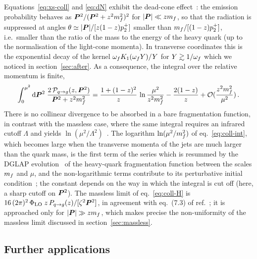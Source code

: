 Equations~\eqref{eq:xs-coll} and \eqref{eq:dN} exhibit the dead-cone
effect~\cite{Dokshitzer:1991fd}: the emission probability behaves as $\bm{P}^2/(\bm{P}^2+z^2m_f^2)^2$ for
$|\bm{P}|\ll zm_f$, so that the radiation is suppressed at angles
$\theta\simeq|\bm{P}|/[z(1-z)p_2^+]$ smaller than $m_f/[(1-z)p_2^+]$, i.e.\ smaller than the ratio of the
mass to the energy of the heavy quark (up to the normalisation of the light-cone momenta). In transverse coordinates this is the exponential decay of the
kernel $\omega_f K_1(\omega_f Y)/Y$ for $Y\gtrsim1/\omega_f$ which we noticed in section~\ref{sec:after}. As a
consequence, the integral over the relative momentum is finite,
\begin{equation}
\int_0^{\mu^2}{\rm d}\bm{P}^2\;\frac{2\,\mathcal{P}_{q\to g}(z,\bm{P}^2)}{\bm{P}^2+z^2m_f^2}
=\frac{1+(1-z)^2}{z}\,\ln\frac{\mu^2}{z^2m_f^2}-\frac{2(1-z)}{z}+\mathcal{O}(\frac{z^2m_f^2}{\mu^2})\,.
\label{eq:coll-int}
\end{equation}
There is no collinear divergence to be absorbed in a bare fragmentation function, in contrast with the
massless case, where the same integral requires an infrared cutoff $\Lambda$ and yields
$\ln(\mu^2/\Lambda^2)$~\cite{Iancu:2022gpw}. The logarithm $\ln(\mu^2/m_f^2)$ of
eq.~\eqref{eq:coll-int}, which becomes large when the transverse momenta of the jets are much larger
than the quark mass, is the first term of the series which is resummed by the DGLAP
evolution~\cite{Gribov:1972ri,Altarelli:1977zs,Dokshitzer:1977sg} of the heavy-quark fragmentation
function between the scales $m_f$ and $\mu$, and the non-logarithmic terms contribute to its
perturbative initial condition~\cite{Mele:1990cw}; the constant depends on the way in which the
integral is cut off (here, a sharp cutoff on $\bm{P}^2$). The massless limit of eq.~\eqref{eq:coll-H} is
$16\,(2\pi)^2\,\Phi_{\rm LO}\;z\,P_{q\to g}(z)/[\zeta^2\bm{P}^2]$, in agreement with eq.~(7.3) of
ref.~\cite{Iancu:2022gpw}; it is approached only for $|\bm{P}|\gg zm_f$, which makes precise the
non-uniformity of the massless limit discussed in section~\ref{sec:massless}.

\subsection{Further applications}
\label{sec:apps}

